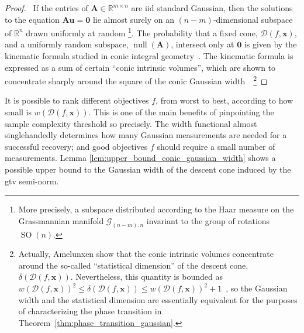 \clearpage

\begin{proof}
    \pfsketch\ If the entries of $\mathbf{A} \in \mathbb{R}^{m \times n}$ are \acrshort{iid} standard Gaussian, then the solutions to the equation $\mathbf{A u} = \mathbf{0}$ lie almost surely on an $(n - m)$-dimensional subspace of $\mathbb{R}^{n}$ drawn uniformly at random \footnote{More precisely, a subspace distributed according to the Haar measure on the Grassmannian manifold $\mathcal{G}_{(n-m),n}$ invariant to the group of rotations $\operatorname{SO}(n)$.}. The probability that a fixed cone, $\mathcal{D}(f, \mathbf{x})$, and a uniformly random subspace, $\operatorname{null} \left ( \mathbf{A} \right )$, intersect only at $\mathbf{0}$ is given by the kinematic formula studied in conic integral geometry~\cite{schneider2008}. The kinematic formula is expressed as a sum of certain ``conic intrinsic volumes'', which are shown to concentrate sharply around the square of the conic Gaussian width~\cite{amelunxen2014}~\footnote{Actually, Amelunxen \etal show that the conic intrinsic volumes concentrate around the so-called ``statistical dimension'' of the descent cone, $\delta(\mathcal{D}(f, \mathbf{x}))$. Nevertheless, this quantity is bounded as $w(\mathcal{D}(f, \mathbf{x}))^2 \leq \delta(\mathcal{D}(f, \mathbf{x})) \leq w(\mathcal{D}(f, \mathbf{x}))^2 + 1$~\cite[Prop. 10.2]{amelunxen2014}, so the Gaussian width and the statistical dimension are essentially equivalent for the purposes of characterizing the phase transition in Theorem~\ref{thm:phase_transition_gaussian}.}
\end{proof}

It is possible to rank different objectives $f$, from worst to best, according to how small is $w(\mathcal{D}(f, \mathbf{x}))$. This is one of the main benefits of pinpointing the sample complexity threshold so precisely. The width functional almost singlehandedly determines how many Gaussian measurements are needed for a successful recovery; and good objectives $f$ should require a small number of measurements. Lemma \ref{lem:upper_bound_conic_gaussian_width} shows a possible upper bound to the Gaussian width of the descent cone induced by the \acrshort{gtv} semi-norm.


